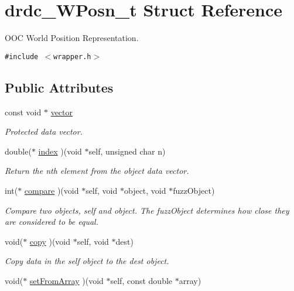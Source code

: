 \hypertarget{structdrdc__WPosn__t}{
\section{drdc\_\-WPosn\_\-t Struct Reference}
\label{structdrdc__WPosn__t}
}
OOC World Position Representation.  


{\tt \#include $<$wrapper.h$>$}

\subsection*{Public Attributes}
\begin{CompactItemize}
\item 
const void $\ast$ \hyperlink{structdrdc__WPosn__t_dd71fc55fbe80eaa57e0666d661395e8}{vector}
\begin{CompactList}\small\item\em Protected data vector. \item\end{CompactList}\item 
double($\ast$ \hyperlink{structdrdc__WPosn__t_fe7d9231dfd6645858e0427d49c78e2b}{index} )(void $\ast$self, unsigned char n)
\begin{CompactList}\small\item\em Return the nth element from the object data vector. \item\end{CompactList}\item 
int($\ast$ \hyperlink{structdrdc__WPosn__t_cd52c076640186112fd6f8a7bd6a626d}{compare} )(void $\ast$self, void $\ast$object, void $\ast$fuzzObject)
\begin{CompactList}\small\item\em Compare two objects, self and object. The fuzzObject determines how close they are considered to be equal. \item\end{CompactList}\item 
void($\ast$ \hyperlink{structdrdc__WPosn__t_82a7fe2ab8a4226c4676b10de72d82d8}{copy} )(void $\ast$self, void $\ast$dest)
\begin{CompactList}\small\item\em Copy data in the self object to the dest object. \item\end{CompactList}\item 
void($\ast$ \hyperlink{structdrdc__WPosn__t_9bcd805098f9465c01d2e718afb6c5b1}{setFromArray} )(void $\ast$self, const double $\ast$array)

\end{CompactItemize}
